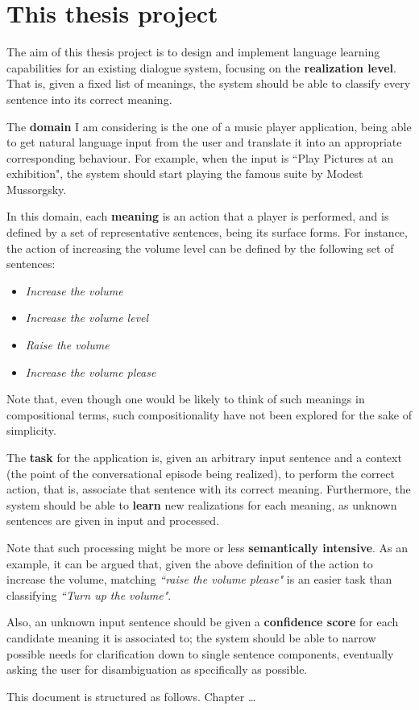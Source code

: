 
\section*{This thesis project} \label{ch:intro:project}

The aim of this thesis project is to design and implement language learning capabilities for an existing dialogue system, focusing on the \textbf{realization level}. That is, given a fixed list of meanings, the system should be able to classify every sentence into its correct meaning.

The \textbf{domain} I am considering is the one of a music player application, being able to get natural language input from the user and translate it into an appropriate corresponding behaviour. For example, when the input is ``Play Pictures at an exhibition", the system should start playing the famous suite by Modest Mussorgsky.

In this domain, each \textbf{meaning} is an action that a player is performed, and is defined by a set of representative sentences, being its surface forms. For instance, the action of increasing the volume level can be defined by the following set of sentences:
\begin{itemize}
	\item \textit{Increase the volume}
	\item \textit{Increase the volume level}
	\item \textit{Raise the volume}
	\item \textit{Increase the volume please}
\end{itemize}

Note that, even though one would be likely to think of such meanings in compositional terms, such compositionality have not been explored for the sake of simplicity.

The \textbf{task} for the application is, given an arbitrary input sentence and a context (the point of the conversational episode being realized), to perform the correct action, that is, associate that sentence with its correct meaning. Furthermore, the system should be able to \textbf{learn} new realizations for each meaning, as unknown sentences are given in input and processed.

Note that such processing might be more or less \textbf{semantically intensive}. As an example, it can be argued that, given the above definition of the action to increase the volume, matching \textit{``raise the volume please"} is an easier task than classifying \textit{``Turn up the volume"}.

Also, an unknown input sentence should be given a \textbf{confidence score} for each candidate meaning it is associated to; the system should be able to narrow possible needs for clarification down to single sentence components, eventually asking the user for disambiguation as specifically as possible.

This document is structured as follows. Chapter \ldots